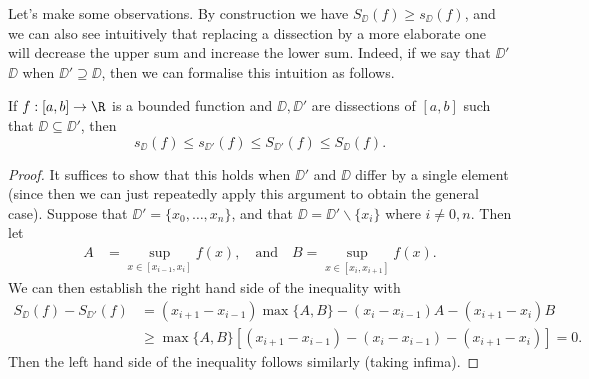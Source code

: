 \documentclass[a4paper]{scrartcl}
\begin{document}
\begin{center}

\end{center}

Let's make some observations. By construction we have $S_\DD (f) \geq s_\DD(f)$, and we can also see intuitively that replacing a dissection by a more elaborate one will decrease the upper sum and increase the lower sum. Indeed, if we say that $\DD'$  $\DD$ when $\DD' \supseteq \DD$, then we can formalise this intuition as follows.

\begin{lemma}
	If $f: [a, b] \rightarrow \R$ is a bounded function and $\DD, \DD'$ are dissections of $[a, b]$ such that $\DD \subseteq \DD'$, then 
	$$s_\DD(f) \leq s_{\DD'}(f) \leq S_{\DD'}(f) \leq S_{\DD}(f).$$
\end{lemma}
\begin{proof}
	It suffices to show that this holds when $\DD'$ and $\DD$ differ by a single element (since then we can just repeatedly apply this argument to obtain the general case).
	Suppose that $\DD' = \{x_0, \dots, x_n\}$, and that $\DD = \DD' \backslash \{x_i\}$ where $i \neq 0, n$. Then let
	\begin{align*}
		A &= \sup_{x \in [x_{i - 1}, x_i]} f(x), \quad \text{and} \quad B = \sup_{x \in [x_{i}, x_{i+1}]} f(x).
	\end{align*}
	We can then establish the right hand side of the inequality with
	\begin{align*}
		S_{\DD}(f) - S_{\DD'}(f) &= (x_{i+1} - x_{i-1})\max\{A, B\} - (x_{i} - x_{i - 1})A - (x_{i + 1} - x_i)B \\
		&\geq \max\{A, B\}[(x_{i+1} - x_{i-1}) - (x_{i} - x_{i - 1}) - (x_{i + 1} - x_i)] = 0.
	\end{align*}
	Then the left hand side of the inequality follows similarly (taking infima).
\end{proof}
\end{document}
